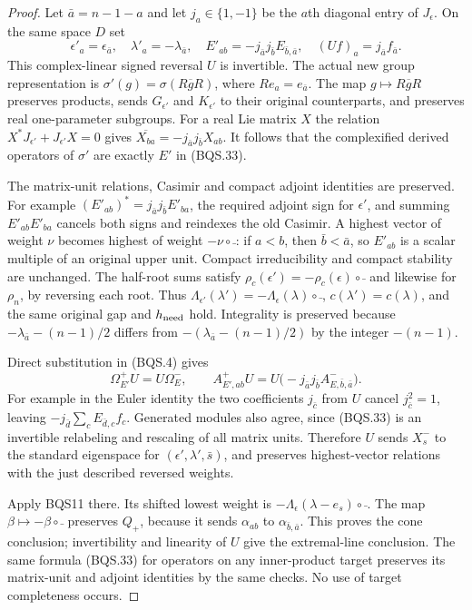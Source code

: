 \documentclass[11pt,a4paper]{article}
\numberwithin{equation}{section}
\theoremstyle{remark}\newtheorem{remark}[theorem]{Remark}
\begin{document}
\begin{proof}
Let $\bar a=n-1-a$ and let $j_a\in\{1,-1\}$ be the $a$th diagonal
entry of $J_\epsilon$.  On the same space $D$ set
\[
 \epsilon'_a=\epsilon_{\bar a},\quad
 \lambda'_a=-\lambda_{\bar a},\quad
 E'_{ab}=-j_{\bar a}j_{\bar b}E_{\bar b,\bar a},\quad
 (Uf)_a=j_{\bar a}f_{\bar a}.
 \tag{BQS.33}
\]
This complex-linear signed reversal $U$ is invertible.
The actual new group representation is
$\sigma'(g)=\sigma(R\overline gR)$, where $R e_a=e_{\bar a}$.
The map $g\mapsto R\overline gR$ preserves products, sends
$G_{\epsilon'}$ and $K_{\epsilon'}$ to their original counterparts,
and preserves real one-parameter subgroups.
For a real Lie matrix $X$ the relation
$X^*J_{\epsilon'}+J_{\epsilon'}X=0$ gives
$\overline{X_{ba}}=-j_{\bar a}j_{\bar b}X_{ab}$.
It follows that the complexified derived operators of $\sigma'$ are
exactly $E'$ in (BQS.33).

The matrix-unit relations, Casimir and compact adjoint identities are
preserved.  For example
$(E'_{ab})^*=j_{\bar a}j_{\bar b}E'_{ba}$, the required adjoint sign
for $\epsilon'$, and summing $E'_{ab}E'_{ba}$ cancels both signs and
reindexes the old Casimir.
A highest vector of weight $\nu$ becomes highest of weight
$-\nu\circ\bar{\ }$: if $a<b$, then $\bar b<\bar a$, so
$E'_{ab}$ is a scalar multiple of an original upper unit.
Compact irreducibility and compact stability are unchanged.
The half-root sums satisfy
$\rho_c(\epsilon')=-\rho_c(\epsilon)\circ\bar{\ }$ and likewise for
$\rho_n$, by reversing each root.
Thus
$\Lambda_{\epsilon'}(\lambda')=-\Lambda_\epsilon(\lambda)\circ\bar{\ }$,
$c(\lambda')=c(\lambda)$, and the same original gap and $h_{\rm need}$
hold.  Integrality is preserved because
$-\lambda_{\bar a}-(n-1)/2$ differs from
$-(\lambda_{\bar a}-(n-1)/2)$ by the integer $-(n-1)$.

Direct substitution in (BQS.4) gives
\[
 \Omega^+_{E'}U=U\Omega^-_E,\qquad
 A^+_{E',ab}U
     =U\bigl(-j_{\bar a}j_{\bar b}A^-_{E,\bar b,\bar a}\bigr).
 \tag{BQS.34}
\]
For example in the Euler identity the two coefficients
$j_{\bar c}$ from $U$ cancel $j_{\bar c}^2=1$, leaving
$-j_{\bar d}\sum_cE_{\bar d,c}f_c$.
Generated modules also agree, since (BQS.33) is an invertible
relabeling and rescaling of all matrix units.
Therefore $U$ sends $X_s^-$ to the standard eigenspace for
$(\epsilon',\lambda',\bar s)$, and preserves highest-vector relations
with the just described reversed weights.

Apply BQS11 there.  Its shifted lowest weight is
$-\Lambda_\epsilon(\lambda-e_s)\circ\bar{\ }$.
The map $\beta\mapsto-\beta\circ\bar{\ }$ preserves $Q_+$, because
it sends $\alpha_{ab}$ to $\alpha_{\bar b,\bar a}$.
This proves the cone conclusion; invertibility and linearity of $U$
give the extremal-line conclusion.
The same formula (BQS.33) for operators on any inner-product target
preserves its matrix-unit and adjoint identities by the same checks.
No use of target completeness occurs.
\end{proof}
\end{document}
